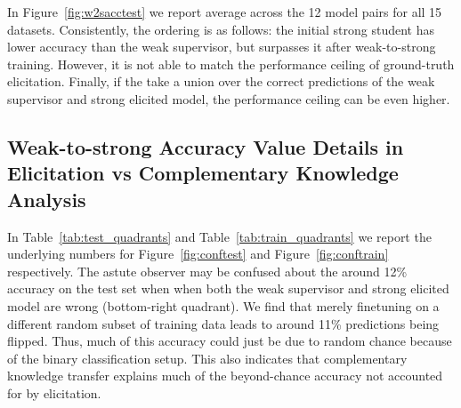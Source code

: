 In Figure~\ref{fig:w2sacctest} we report average across the 12 model pairs for all 15 datasets. Consistently, the ordering is as follows: the initial strong student has lower accuracy than the weak supervisor, but surpasses it after weak-to-strong training. However, it is not able to match the performance ceiling of ground-truth elicitation. Finally, if the take a union over the correct predictions of the weak supervisor and strong elicited model, the performance ceiling can be even higher.

\subsection{Weak-to-strong Accuracy Value Details in Elicitation vs Complementary Knowledge Analysis}
In Table~\ref{tab:test_quadrants} and Table~\ref{tab:train_quadrants} we report the underlying numbers for Figure~\ref{fig:conftest} and Figure~\ref{fig:conftrain} respectively. The astute observer may be confused about the around 12\% accuracy on the test set when when both the weak supervisor and strong elicited model are wrong (bottom-right quadrant). We find that merely finetuning on a different random subset of training data leads to around 11\% predictions being flipped. Thus, much of this accuracy could just be due to random chance because of the binary classification setup. This also indicates that complementary knowledge transfer explains much of the beyond-chance accuracy not accounted for by elicitation.

